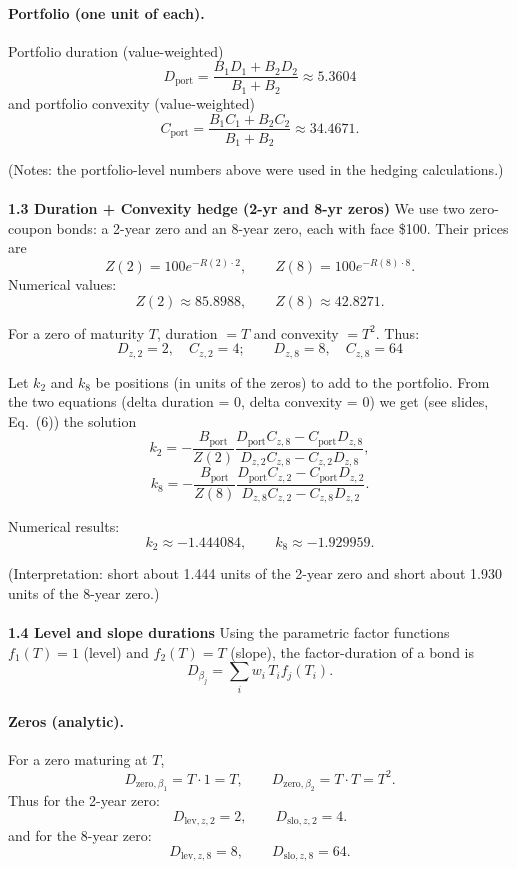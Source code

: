 \paragraph{Portfolio (one unit of each).}
Portfolio duration (value-weighted)
\[
D_{\text{port}}=\frac{B_1 D_1 + B_2 D_2}{B_1+B_2}\approx \boxed{5.3604}
\]
and portfolio convexity (value-weighted)
\[
C_{\text{port}}=\frac{B_1 C_1 + B_2 C_2}{B_1+B_2} \approx \boxed{34.4671}.
\]

(Notes: the portfolio-level numbers above were used in the hedging calculations.)
\\ \\
\textbf{1.3 Duration + Convexity hedge (2-yr and 8-yr zeros)}
We use two zero-coupon bonds: a 2-year zero and an 8-year zero, each with face \$100.
Their prices are
\[
Z(2)=100e^{-R(2)\cdot 2},\qquad Z(8)=100e^{-R(8)\cdot 8}.
\]
Numerical values:
\[
\boxed{Z(2) \approx 85.8988,\qquad Z(8) \approx 42.8271.}
\]

For a zero of maturity \(T\), duration \(=T\) and convexity \(=T^2\). Thus:
\[
\boxed{D_{z,2}=2,\quad C_{z,2}=4;\qquad D_{z,8}=8,\quad C_{z,8}=64}
\]

Let \(k_2\) and \(k_8\) be positions (in units of the zeros) to add to the portfolio.
From the two equations (delta duration = 0, delta convexity = 0) we get (see slides, Eq.~(6))
the solution
\[
k_{2} = -\frac{B_{\text{port}}}{Z(2)}\frac{D_{\text{port}}C_{z,8}-C_{\text{port}}D_{z,8}}{D_{z,2}C_{z,8}-C_{z,2}D_{z,8}},
\]
\[
k_{8} = -\frac{B_{\text{port}}}{Z(8)}\frac{D_{\text{port}}C_{z,2}-C_{\text{port}}D_{z,2}}{D_{z,8}C_{z,2}-C_{z,8}D_{z,2}}.
\]

Numerical results:
\[
\boxed{k_{2} \approx -1.444084,\qquad k_{8} \approx -1.929959.}
\]

(Interpretation: short about 1.444 units of the 2-year zero and short about 1.930 units of the 8-year zero.)
\\ \\ 
\textbf{1.4 Level and slope durations}
Using the parametric factor functions \(f_1(T)=1\) (level) and \(f_2(T)=T\) (slope), the factor-duration of a bond is
\[
D_{\beta_j} = \sum_i w_i\,T_i f_j(T_i).
\]

\paragraph{Zeros (analytic).}
For a zero maturing at \(T\),
\[
D_{\text{zero},\beta_1}=T\cdot 1 = T,\qquad D_{\text{zero},\beta_2}=T\cdot T = T^2.
\]
Thus for the 2-year zero:
\[
\boxed{D_{\text{lev},z,2}=2,\qquad D_{\text{slo},z,2}=4.}
\]
and for the 8-year zero:
\[
\boxed{D_{\text{lev},z,8}=8,\qquad D_{\text{slo},z,8}=64.}
\]

